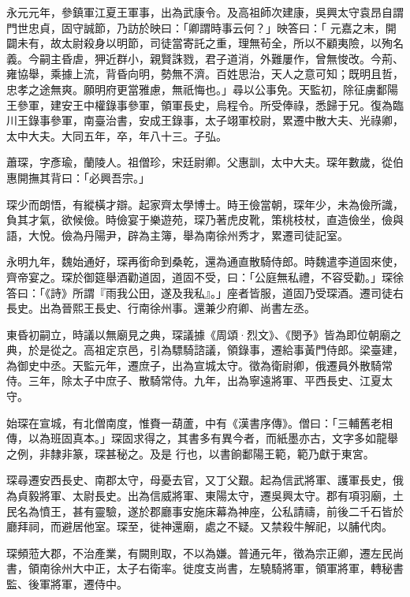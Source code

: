 \begin{pinyinscope}
 永元元年，參鎮軍江夏王軍事，出為武康令。及高祖師次建康，吳興太守袁昂自謂門世忠貞，固守誠節，乃訪於映曰：「卿謂時事云何？」映答曰：「
 元嘉之末，開闢未有，故太尉殺身以明節，司徒當寄託之重，理無茍全，所以不顧夷險，以殉名義。今嗣主昏虐，狎近群小，親賢誅戮，君子道消，外難屢作，曾無悛改。今荊、雍協舉，乘據上流，背昏向明，勢無不濟。百姓思治，天人之意可知；既明且哲，忠孝之途無爽。願明府更當雅慮，無祇悔也。」尋以公事免。天監初，除征虜鄱陽王參軍，建安王中權錄事參軍，領軍長史，烏程令。所受俸祿，悉歸于兄。復為臨川王錄事參軍，南臺治書，安成王錄事，太子翊軍校尉，累遷中散大夫、光祿卿，太中大夫。大同五年，卒，年八十三。子弘。



 蕭琛，字彥瑜，蘭陵人。祖僧珍，宋廷尉卿。父惠訓，太中大夫。琛年數歲，從伯惠開撫其背曰：「必興吾宗。」



 琛少而朗悟，有縱橫才辯。起家齊太學博士。時王儉當朝，琛年少，未為儉所識，負其才氣，欲候儉。時儉宴于樂遊苑，琛乃著虎皮靴，策桃枝杖，直造儉坐，儉與語，大悅。儉為丹陽尹，辟為主簿，舉為南徐州秀才，累遷司徒記室。



 永明九年，魏始通好，琛再銜命到桑乾，還為通直散騎侍郎。時魏遣李道固來使，齊帝宴之。琛於御筵舉酒勸道固，道固不受，曰：「公庭無私禮，不容受勸。」琛徐答曰：「《詩》所謂『雨我公田，遂及我私』。」座者皆服，道固乃受琛酒。遷司徒右
 長史。出為晉熙王長史、行南徐州事。還兼少府卿、尚書左丞。



 東昏初嗣立，時議以無廟見之典，琛議據《周頌·烈文》、《閔予》皆為即位朝廟之典，於是從之。高祖定京邑，引為驃騎諮議，領錄事，遷給事黃門侍郎。梁臺建，為御史中丞。天監元年，遷庶子，出為宣城太守。徵為衛尉卿，俄遷員外散騎常侍。三年，除太子中庶子、散騎常侍。九年，出為寧遠將軍、平西長史、江夏太守。



 始琛在宣城，有北僧南度，惟賚一葫蘆，中有《漢書序傳》。僧曰：「三輔舊老相傳，以為班固真本。」琛固求得之，其書多有異今者，而紙墨亦古，文字多如龍舉之例，非隸非篆，琛甚秘之。及是
 行也，以書餉鄱陽王範，範乃獻于東宮。



 琛尋遷安西長史、南郡太守，母憂去官，又丁父艱。起為信武將軍、護軍長史，俄為貞毅將軍、太尉長史。出為信威將軍、東陽太守，遷吳興太守。郡有項羽廟，土民名為憤王，甚有靈驗，遂於郡廳事安施床幕為神座，公私請禱，前後二千石皆於廳拜祠，而避居他室。琛至，徙神還廟，處之不疑。又禁殺牛解祀，以脯代肉。



 琛頻蒞大郡，不治產業，有闕則取，不以為嫌。普通元年，徵為宗正卿，遷左民尚書，領南徐州大中正，太子右衛率。徙度支尚書，左驍騎將軍，領軍將軍，轉秘書監、後軍將軍，遷侍中。




\end{pinyinscope}

